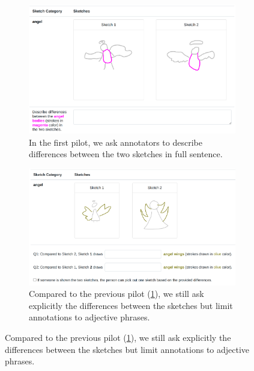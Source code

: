 \begin{figure}[!h]
\begin{subfigure}{\textwidth}
\centering
\includegraphics[width=.8\linewidth]{data_collection/version2/v2annofeb1.png}  
\caption{In the first pilot, we ask annotators to describe differences between the two sketches in full sentence.}
\label{v2.main_task.1.a}
\end{subfigure}
\newline
\begin{subfigure}{\textwidth}
\centering
\includegraphics[width=.8\linewidth]{data_collection/version2/v2annofeb4.png}  
\caption{Compared to the previous pilot (\ref{v2.main_task.1.a}), we still ask explicitly the differences between the sketches but limit annotations to adjective phrases.}
\label{v2.main_task.1.b}
\end{subfigure}
\end{figure}
  
